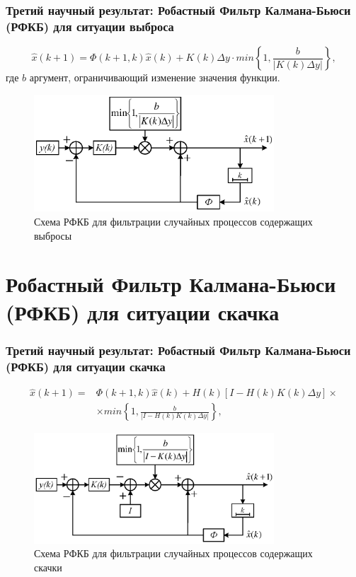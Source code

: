 \documentclass[10pt,pdf,hyperref={unicode}]{beamer}
\begin{document}
\begin{frame}
\frametitle{Третий научный результат: Робастный Фильтр Калмана-Бьюси (РФКБ) для ситуации выброса}

\begin{equation}\label{eq3:skachok}
\hat{x}(k+1)=\Phi(k+1,k)\hat{x}(k)+K(k)\Delta y\cdot min\left\{1,\frac{b}{|K(k)\Delta y|}\right\},
\end{equation}
где $b$ аргумент, ограничивающий изменение значения функции.
\begin{figure} [h]
  \center
\includegraphics[width=0.8\textwidth]{3chapter/output.eps}
  \caption*{Схема РФКБ для фильтрации случайных процессов содержащих выбросы}
  \label{img3:kalmanV}
\end{figure}

\end{frame}


\section{Робастный Фильтр Калмана-Бьюси (РФКБ) для ситуации скачка}

\begin{frame}
\frametitle{Третий научный результат: Робастный Фильтр Калмана-Бьюси (РФКБ) для ситуации скачка}

\begin{equation}\label{eq3:vibros}
\begin{split}
\hat{x}(k+1)=&\Phi(k+1,k)\hat{x}(k)+H(k)[I-H(k)K(k)\Delta y]\times \\
&\times min\left\{1,\frac{b}{|I-H(k)K(k)\Delta y|}\right\},
\end{split}
\end{equation}
\begin{figure} [h]
  \center
\includegraphics[width=0.8\textwidth]{3chapter/output1.eps}
  \caption*{Схема РФКБ для фильтрации случайных процессов содержащих скачки}
  \label{img3:kalmanS}
\end{figure}
\end{frame}
\end{document}
